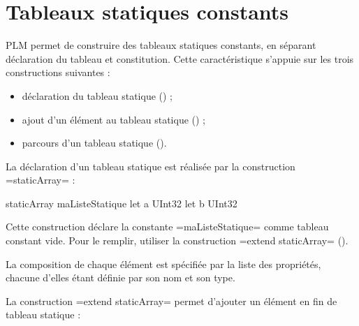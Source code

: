 




\chapter{Tableaux statiques constants}

PLM permet de construire des tableaux statiques constants, en séparant déclaration du tableau et constitution. Cette caractéristique s'appuie sur les trois constructions suivantes :
\begin{itemize}
  \item déclaration du tableau statique () ;
  \item ajout d'un élément au tableau statique () ;
  \item parcours d'un tableau statique ().
\end{itemize}












La déclaration d'un tableau statique est réalisée par la construction \plm=staticArray= :

\begin{PLM}
staticArray maListeStatique {
  let a UInt32
  let b UInt32
}
\end{PLM}

Cette construction déclare la constante \plm=maListeStatique= comme tableau constant vide. Pour le remplir, utiliser la construction \plm=extend staticArray= ().

La composition de chaque élément est spécifiée par la liste des propriétés, chacune d'elles étant définie par son nom et son type.










La construction \plm=extend staticArray= permet d'ajouter un élément en fin de tableau statique :

